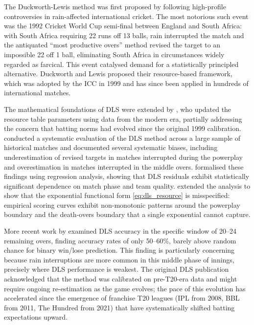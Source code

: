 \documentclass[10pt,a4paper,twocolumn]{article}
\begin{document}
The Duckworth-Lewis method was first proposed by \citet{Duckworth1998} following high-profile controversies in rain-affected international cricket. The most notorious such event was the 1992 Cricket World Cup semi-final between England and South Africa: with South Africa requiring 22 runs off 13 balls, rain interrupted the match and the antiquated ``most productive overs'' method revised the target to an impossible 22 off 1 ball, eliminating South Africa in circumstances widely regarded as farcical. This event catalysed demand for a statistically principled alternative. Duckworth and Lewis proposed their resource-based framework, which was adopted by the ICC in 1999 and has since been applied in hundreds of international matches.

The mathematical foundations of DLS were extended by \citet{Stern2016}, who updated the resource table parameters using data from the modern era, partially addressing the concern that batting norms had evolved since the original 1999 calibration. \citet{McHale2011} conducted a systematic evaluation of the DLS method across a large sample of historical matches and documented several systematic biases, including underestimation of revised targets in matches interrupted during the powerplay and overestimation in matches interrupted in the middle overs. \citet{Bhattacharya2011} formalised these findings using regression analysis, showing that DLS residuals exhibit statistically significant dependence on match phase and team quality. \citet{Carter2004} extended the analysis to show that the exponential functional form \eqref{eq:dls_resource} is misspecified: empirical scoring curves exhibit non-monotonic patterns around the powerplay boundary and the death-overs boundary that a single exponential cannot capture.

More recent work by \citet{Zia2022} examined DLS accuracy in the specific window of 20--24 remaining overs, finding accuracy rates of only 50--60\%, barely above random chance for binary win/lose prediction. This finding is particularly concerning because rain interruptions are more common in this middle phase of innings, precisely where DLS performance is weakest. The original DLS publication acknowledged that the method was calibrated on pre-T20-era data and might require ongoing re-estimation as the game evolves; the pace of this evolution has accelerated since the emergence of franchise T20 leagues (IPL from 2008, BBL from 2011, The Hundred from 2021) that have systematically shifted batting expectations upward.
\end{document}
